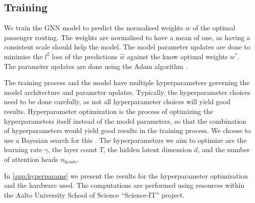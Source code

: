 \documentclass[english, 12pt, a4paper, sci, utf8, a-2b, online]{aaltothesis}
\newcommand{\draft}[1]{\textcolor{red}{\em (DRAFT) #1}}
\begin{document}
\subsection{Training}
\label{sec:training}

We train the GNN model to predict the normalised weights $w$ of the optimal passenger routing. The weights are normalised to have a mean of one, as having a consistent scale should help the model. The model parameter updates are done to minimise the $l^2$ loss of the predictions $\hat{w}$ against the know optimal weights $w^*$. The parameter updates are done using the Adam algorithm \cite{adam-2014}.

The training process and the model have multiple hyperparameters governing the model architecture and parameter updates. Typically, the hyperparameter choices need to be done carefully, as not all hyperparameter choices will yield good results. Hyperparameter optimization is the process of optimizing the hyperparameters itself instead of the model parameters, so that the combination of hyperparameters would yield good results in the training process. We choose to use a Bayesian search for this \cite{bayes-hyper}. The hyperparameters we aim to optimize are the learning rate $\gamma$, the layer count $T$, the hidden latent dimension $d$, and the number of attention heads $n_\textit{heads}$.

In \cref{app:hyperparams} we present the results for the hyperparameter optimization and the hardware used. The computations are performed using resources within the Aalto University School of Science “Science-IT” project.

    
\clearpage
\end{document}
